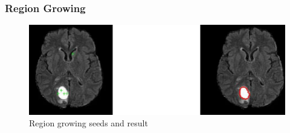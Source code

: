 \subsubsection{Region Growing}
\begin{figure}[h]
	\centerline{\includegraphics[scale=0.5]{images/regionGrowing.png}}
	\caption{Region growing seeds and result \cite{pandyaExploringImageSegmentation2024}}\label{fig:rgSR}
\end{figure}

